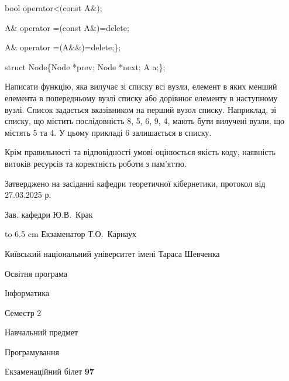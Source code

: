 \documentclass[12pt, ukrainian]{article}
\begin{document}
{\quad  bool operator<(const A\&); 

\quad A\& operator =(const A\&)=delete; 

\quad  A\& operator =(A\&\&)=delete;\};

struct Node\{Node *prev; Node *next; A a;\};

Написати функцію, яка вилучає зі списку всі вузли, елемент в яких менший елемента в попередньому вузлі списку або дорівнює елементу в наступному вузлі. Список задається вказівником на перший вузол списку. Наприклад, зі списку, що містить послідовність 8, 5, 6, 9, 4, мають бути вилучені вузли, що містять 5 та 4. У цьому прикладі 6 залишається в списку.

Крім правильності та відповідності умові оцінюється якість коду, наявність витоків ресурсів та коректність роботи з пам'яттю. 

}
{\smallskip\smallskip \begin {scriptsize} Затверджено на засіданні кафедри теоретичної кібернетики, протокол   від   27.03.2025 р.\par\smallskip\smallskip\smallskip\smallskip
{\parbox {6.5 cm} {Зав. кафедри \dotfill Ю.В.~Крак}}\hspace {0.7cm} {\hbox to 6.5 cm { Екзаменатор \dotfill Т.О.~Карнаух}} \end{scriptsize}}
\newpage
{{\begin {scriptsize}\par
{ \center  Київський національний університет імені Тараса Шевченка \par}
{\parbox {5 cm}{Освітня програма \hfill}{\parbox {7 cm}{Інформатика\hfill}}\parbox {6 cm}{\hfill Семестр 2}}\par
{\parbox {5 cm} {Навчальний предмет \hfill}\parbox {7 cm}{Програмування \hfill}\parbox {6cm}{\hfill}\par}\vspace{-15pt} \end{scriptsize}}{\center Екзаменаційний білет \No \textbf { 97 }\par}}
\end{document}
